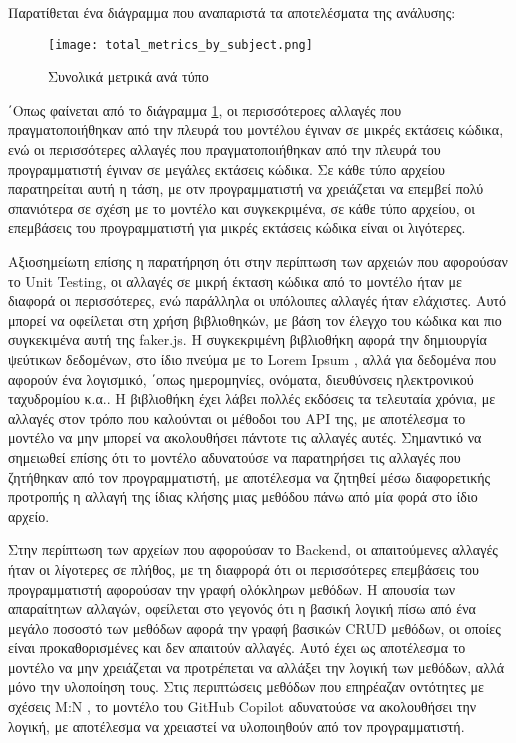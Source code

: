 Παρατίθεται ένα διάγραμμα που αναπαριστά τα αποτελέσματα της ανάλυσης:

\begin{figure}[H]
  \begin{center}
    \texttt{[image: total\_metrics\_by\_subject.png]}
    \label{fig:totalMetrics}
    \caption{Συνολικά μετρικά ανά τύπο}
  \end{center}
\end{figure}

΄Οπως φαίνεται από το διάγραμμα \ref{fig:totalMetrics}, οι περισσότεροες
αλλαγές που πραγματοποιήθηκαν από την πλευρά του μοντέλου έγιναν σε
μικρές εκτάσεις κώδικα, ενώ οι περισσότερες αλλαγές που
πραγματοποιήθηκαν από την πλευρά του προγραμματιστή έγιναν σε μεγάλες
εκτάσεις κώδικα. Σε κάθε τύπο αρχείου παρατηρείται αυτή η τάση, με οτν
προγραμματιστή να χρειάζεται να επεμβεί πολύ σπανιότερα σε σχέση με το
μοντέλο και συγκεκριμένα, σε κάθε τύπο αρχείου, οι επεμβάσεις του
προγραμματιστή για μικρές εκτάσεις κώδικα είναι οι λιγότερες.

Αξιοσημείωτη επίσης η παρατήρηση ότι στην περίπτωση των αρχειών που
αφορούσαν το \textlatin{Unit Testing}, οι αλλαγές σε μικρή έκταση κώδικα
από το μοντέλο ήταν με διαφορά οι περισσότερες, ενώ παράλληλα οι
υπόλοιπες αλλαγές ήταν ελάχιστες. Αυτό μπορεί να οφείλεται στη χρήση
βιβλιοθηκών, με βάση τον έλεγχο του κώδικα και πιο συγκεκιμένα αυτή της
\textlatin{faker.js}\cite{fakerjs}. Η συγκεκριμένη βιβλιοθήκη αφορά την
δημιουργία ψεύτικων δεδομένων, στο ίδιο πνεύμα με το \textlatin{Lorem
  Ipsum} \cite{lipsum}, αλλά για δεδομένα που αφορούν ένα λογισμικό,
΄οπως ημερομηνίες, ονόματα, διευθύνσεις ηλεκτρονικού ταχυδρομίου κ.α.. Η
βιβλιοθήκη έχει λάβει πολλές εκδόσεις τα τελευταία χρόνια, με αλλαγές
στον τρόπο που καλούνται οι μέθοδοι του \textlatin{API} της, με
αποτέλεσμα το μοντέλο να μην μπορεί να ακολουθήσει πάντοτε τις αλλαγές
αυτές. Σημαντικό να σημειωθεί επίσης ότι το μοντέλο αδυνατούσε να
παρατηρήσει τις αλλαγές που ζητήθηκαν από τον προγραμματιστή, με
αποτέλεσμα να ζητηθεί μέσω διαφορετικής προτροπής η αλλαγή της ίδιας
κλήσης μιας μεθόδου πάνω από μία φορά στο ίδιο αρχείο.

Στην περίπτωση των αρχείων που αφορούσαν το \textlatin{Backend}, οι
απαιτούμενες αλλαγές ήταν οι λίγοτερες σε πλήθος, με τη διαφρορά ότι οι
περισσότερες επεμβάσεις του προγραμματιστή αφορούσαν την γραφή ολόκληρων
μεθόδων. Η απουσία των απαραίτητων αλλαγών, οφείλεται στο γεγονός ότι η
βασική λογική πίσω από ένα μεγάλο ποσοστό των μεθόδων αφορά την γραφή
βασικών \textlatin{CRUD} μεθόδων, οι οποίες είναι προκαθορισμένες και
δεν απαιτούν αλλαγές. Αυτό έχει ως αποτέλεσμα το μοντέλο να μην
χρειάζεται να προτρέπεται να αλλάξει την λογική των μεθόδων, αλλά μόνο
την υλοποίηση τους. Στις περιπτώσεις μεθόδων που επηρέαζαν οντότητες με
σχέσεις Μ:Ν \cite{prisma2022manytomany}, το μοντέλο του
\textlatin{GitHub Copilot} αδυνατούσε να ακολουθήσει την λογική, με
αποτέλεσμα να χρειαστεί να υλοποιηθούν από τον προγραμματιστή.

